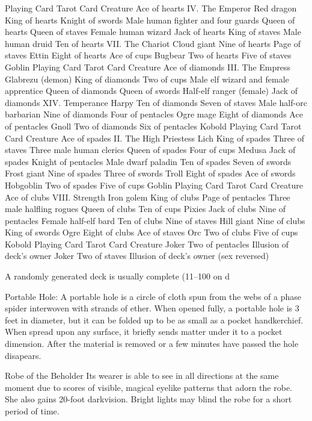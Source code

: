 Playing Card 	Tarot Card 	Creature
Ace of hearts 	IV. The Emperor 	Red dragon
King of hearts 	Knight of swords 	Male human fighter and four guards
Queen of hearts 	Queen of staves 	Female human wizard
Jack of hearts 	King of staves 	Male human druid
Ten of hearts 	VII. The Chariot 	Cloud giant
Nine of hearts 	Page of staves 	Ettin
Eight of hearts 	Ace of cups 	Bugbear
Two of hearts 	Five of staves 	Goblin
Playing Card 	Tarot Card 	Creature
Ace of diamonds 	III. The Empress 	Glabrezu (demon)
King of diamonds 	Two of cups 	Male elf wizard and female apprentice
Queen of diamonds 	Queen of swords 	Half-elf ranger (female)
Jack of diamonds 	XIV. Temperance 	Harpy
Ten of diamonds 	Seven of staves 	Male half-orc barbarian
Nine of diamonds 	Four of pentacles 	Ogre mage
Eight of diamonds 	Ace of pentacles 	Gnoll
Two of diamonds 	Six of pentacles 	Kobold
Playing Card 	Tarot Card 	Creature
Ace of spades 	II. The High Priestess 	Lich
King of spades 	Three of staves 	Three male human clerics
Queen of spades 	Four of cups 	Medusa
Jack of spades 	Knight of pentacles 	Male dwarf paladin
Ten of spades 	Seven of swords 	Frost giant
Nine of spades 	Three of swords 	Troll
Eight of spades 	Ace of swords 	Hobgoblin
Two of spades 	Five of cups 	Goblin
Playing Card 	Tarot Card 	Creature
Ace of clubs 	VIII. Strength 	Iron golem
King of clubs 	Page of pentacles 	Three male halfling rogues
Queen of clubs 	Ten of cups 	Pixies
Jack of clubs 	Nine of pentacles 	Female half-elf bard
Ten of clubs 	Nine of staves 	Hill giant
Nine of clubs 	King of swords 	Ogre
Eight of clubs 	Ace of staves 	Orc
Two of clubs 	Five of cups 	Kobold
Playing Card 	Tarot Card 	Creature
Joker 	Two of pentacles 	Illusion of deck’s owner
Joker 	Two of staves 	Illusion of deck’s owner (sex reversed)

A randomly generated deck is usually complete (11–100 on d%


Portable Hole: A portable hole is a circle of cloth spun from the webs of a phase spider interwoven with strands of ether. When opened fully, a portable hole is 3 feet in diameter, but it can be folded up to be as small as a pocket handkerchief. When spread upon any surface, it briefly sends matter under it to a pocket dimension.  After the material is removed or a few minutes have passed the hole disapears.  

Robe of the Beholder
Its wearer is able to see in all directions at the same moment due to scores of visible, magical eyelike patterns that adorn the robe. She also gains 20-foot darkvision. Bright lights may blind the robe for a short period of time.


